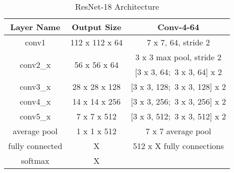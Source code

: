 \vspace*{1.0cm}


\begin{table*}[hbt!]
\begin{center}
\begin{tabular}{|c|c|c|}
\hline
Layer Name             & Output Size                   & Conv-4-64                 \\ \hline\hline
conv1                     & 112 x 112 x 64                & 7 x 7, 64, stride 2        \\ \hline
\multirow{2}{*}{conv2\_x} & \multirow{2}{*}{56 x 56 x 64} & 3 x 3 max pool, stride 2   \\ \cline{3-3} 
                          &                               & [3 x 3, 64$;$ 3 x 3, 64] x 2   \\ \hline
conv3\_x                  & 28 x 28 x 128                 & [3 x 3, 128$;$ 3 x 3, 128] x 2 \\ \hline
conv4\_x                  & 14 x 14 x 256                 & [3 x 3, 256$;$ 3 x 3, 256] x 2 \\ \hline
conv5\_x                  & 7 x 7 x 512                   & [3 x 3, 512$;$ 3 x 3, 512] x 2 \\ \hline
average pool              & 1 x 1 x 512                   & 7 x 7 average pool         \\ \hline
fully connected           & X                             & 512 x X fully connections  \\ \hline
softmax                   & X                             &                            \\ \hline
\end{tabular}
\end{center}
\caption{ResNet-18 Architecture}
\label{table:resnet_arch}
\end{table*}